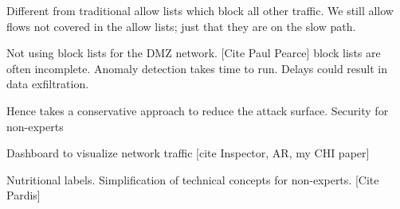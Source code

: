 Different from traditional allow lists which block all other traffic. We still allow flows not covered in the allow lists; just that they are on the slow path.

Not using block lists for the DMZ network. [Cite Paul Pearce] block lists are often incomplete. Anomaly detection takes time to run. Delays could result in data exfiltration.

Hence takes a conservative approach to reduce the attack surface.
Security for non-experts

Dashboard to visualize network traffic [cite Inspector, AR, my CHI paper]

Nutritional labels. Simplification of technical concepts for non-experts. [Cite Pardis]



